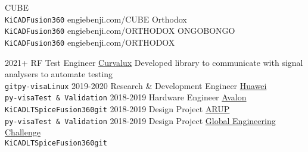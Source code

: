 \documentclass[9pt]{developercv} %
\begin{document}
\vspace{0.5cm}


\begin{entrylist}
	\QRentry
		{CUBE}
		{\lorem\lorem\lorem\\ \texttt{KiCAD}\slashsep\texttt{Fusion360}}
		{engiebenji.com/CUBE}
	\QRentry
		{Orthodox}
		{\lorem\lorem\\ \texttt{KiCAD}\slashsep\texttt{Fusion360}}
		{engiebenji.com/ORTHODOX}
	\QRentry
		{ONGOBONGO}
		{\lorem\lorem\\ \texttt{KiCAD}\slashsep\texttt{Fusion360}}
		{engiebenji.com/ORTHODOX}
\end{entrylist}


\begin{entrylist}
	\entry
		{2021+}
		{RF Test Engineer}
		{\href{https://Curvalux.com}{Curvalux}}
		{
			 Developed library to communicate with signal analysers to automate testing
			\\ \texttt{git}\slashsep\texttt{py-visa}\slashsep\texttt{Linux}
		}
	\entry
		{2019-2020}
		{Research \& Development Engineer}
		{\href{https://www.huawei.com/uk/contact-us}{Huawei}}
		{\lorem\lorem\\ \texttt{py-visa}\slashsep\texttt{Test \& Validation}}
	\entry
		{2018-2019}
		{Hardware Engineer}
		{\href{https://avalonrov.wixsite.com/avalonrov}{Avalon}}
		{\lorem\lorem\\ \texttt{KiCAD}\slashsep\texttt{LTSpice}\slashsep\texttt{Fusion360}\slashsep\texttt{git}}
	\entry
		{2018-2019}
		{Design Project}
		{\href{https://www.huawei.com/uk/contact-us}{ARUP}}
		{\lorem\lorem\\ \texttt{py-visa}\slashsep\texttt{Test \& Validation}}
	\entry
		{2018-2019}
		{Design Project}
		{\href{https://avalonrov.wixsite.com/avalonrov}{Global Engineering Challenge}}
		{\lorem\lorem\\ \texttt{KiCAD}\slashsep\texttt{LTSpice}\slashsep\texttt{Fusion360}\slashsep\texttt{git}}
	
\end{entrylist}
\end{document}

